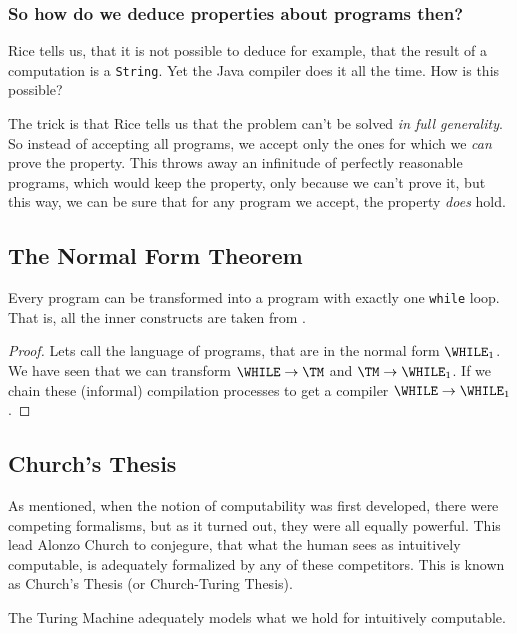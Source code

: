 \subsubsection{So how do we deduce properties about programs then?}
Rice tells us, that it is not possible to deduce for example, 
that the result of a computation is a {\tt String}. Yet the Java compiler 
does it all the time. How is this possible?

The trick is that Rice tells us that the problem can't be solved \emph{in full
generality}. So instead of accepting all programs, we accept only the ones for
which we \emph{can} prove the property. This throws away an infinitude of
perfectly reasonable programs, which would keep the property, only because we
can't prove it, but this way, we can be sure that for any program we accept,
the property \emph{does} hold.

\subsection{The Normal Form Theorem}
\begin{theorem}
	Every \WHILE program can be transformed into a \WHILE program with exactly 
	one {\tt while} loop. That is, all the inner constructs are taken from \FOR.
\end{theorem}
\begin{proof}
	Lets call the language of \WHILE programs, that are in the normal form $\WHILE_1$.
	We have seen that we can transform $\WHILE \rightarrow \TM$ and 
	$\TM \rightarrow \WHILE_1$. If we chain these (informal) compilation processes to 
	get a compiler $\WHILE \rightarrow \WHILE_1$.
\end{proof}

\subsection{Church's Thesis}
As mentioned, when the notion of computability was first developed, there 
were competing formalisms, but as it turned out, they were all equally 
powerful. This lead Alonzo Church to conjegure, that what the human sees 
as intuitively computable, is adequately formalized by any of these 
competitors. This is known as Church's Thesis (or Church-Turing Thesis).

\begin{thesis}
	The Turing Machine adequately models what we hold for intuitively computable.
\end{thesis}

